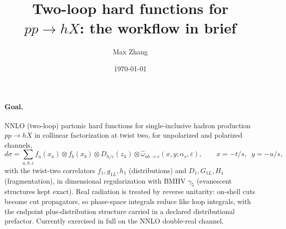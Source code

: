 \documentclass[10pt]{article}
\title{\vspace{-3ex}Two-loop hard functions for $pp \to h X$:
the workflow in brief}
\author{Max Zhang}
\date{\today}
\newcommand{\eps}{\varepsilon}
\newcommand{\as}{\alpha_s}
\begin{document}
\maketitle
\vspace{-4ex}

\paragraph{Goal.}  NNLO (two-loop) partonic hard functions for
single-inclusive hadron production $pp \to h X$ in collinear
factorization at twist two, for unpolarized and polarized channels,
\begin{equation*}
  d\sigma
  = \sum_{a,b,c}
  f_a(x_a) \otimes f_b(x_b) \otimes D_{h/c}(z_h) \otimes
  \hat\omega_{ab\to c}\!\left(x,y;\as,\eps\right),
  \qquad x=-t/s,\;\; y=-u/s,
\end{equation*}
with the twist-two correlators $f_1, g_{1L}, h_1$ (distributions) and
$D_1, G_{1L}, H_1$ (fragmentation), in dimensional regularization with
BMHV $\gamma_5$ (evanescent structures kept exact).  Real radiation is
treated by reverse unitarity: on-shell cuts become cut propagators, so
phase-space integrals reduce like loop integrals, with the endpoint
plus-distribution structure carried in a declared distributional
prefactor.  Currently exercised in full on the NNLO double-real
channel.
\end{document}
